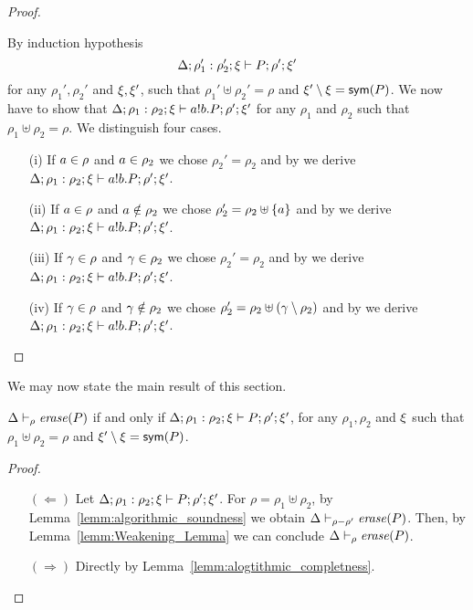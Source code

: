 \begin{proof}
\begin{itemize}
By induction hypothesis
\[
\Delta; \rho_1': \rho_2'; \xi \vdash P; \rho'; \xi'
\] 
for any $\rho_1', \rho_2'$ and $\xi, \xi'$, such that  $\rho_1'\uplus \rho_2'=\rho$ and $\xi'\setminus\xi=\mathsf{sym}(P)$. 
We now have to show that $\Delta; \rho_1:\rho_2 ; \xi \vdash a!b.P ; \rho'; \xi'$ for any $\rho_1$ and $\rho_2$ such that $\rho_1\uplus \rho_2 = \rho$. We distinguish four cases.
\begin{itemize}
\item[(i)] If $a\in\rho$ and $a\in\rho_2$ we chose $\rho_2'=\rho_2$ and by  we derive $\Delta; \rho_1: \rho_2; \xi \vdash a!b.P; \rho'; \xi'$.
%
\item[(ii)] If $a\in\rho$ and $a\notin\rho_2$ we chose $\rho_2'=\rho_2\uplus\{a\}$ and by  we derive $\Delta; \rho_1: \rho_2; \xi \vdash a!b.P; \rho'; \xi'$.
%
\item[(iii)] If $\gamma\in\rho$ and $\gamma\in\rho_2$ we chose $\rho_2'=\rho_2$ and by  we derive $\Delta; \rho_1: \rho_2; \xi \vdash a!b.P; \rho'; \xi'$.
\item[(iv)] If $\gamma\in\rho$ and $\gamma\notin\rho_2$ we chose $\rho_2'=\rho_2\uplus(\gamma\setminus\rho_2)$ and by  we derive $\Delta; \rho_1: \rho_2; \xi \vdash a!b.P; \rho'; \xi'$.
\end{itemize}
\end{itemize} 
\end{proof}

We may now state the main result of this section.


\begin{theorem}\label{lemm:algotirhmic_correctness}%
$\Delta \vdash_\rho \mathit{erase}(P)$ if and only if $\Delta; \rho_1: \rho_2; \xi \vdash P ; \rho'; \xi'$, for any $\rho_1,\rho_2$  and $\xi$ such that $\rho_1\uplus\rho_2=\rho$ and $\xi'\setminus\xi=\mathsf{sym}(P)$.
\end{theorem}
\begin{proof}
\begin{itemize}
\item[]
\item [$(\Leftarrow)$] Let $\Delta; \rho_1: \rho_2; \xi \vdash P ; \rho'; \xi'$. For $\rho=\rho_1\uplus\rho_2$,
by Lemma~\ref{lemm:algorithmic_soundness} we obtain $\Delta \vdash_{\rho-\rho'} \mathit{erase}(P)$. 
Then, by Lemma~\ref{lemm:Weakening_Lemma} we can conclude $\Delta \vdash_\rho \mathit{erase}(P)$.
%
\item [$(\Rightarrow)$] Directly by Lemma~\ref{lemm:alogtithmic_completness}.
\end{itemize}
\end{proof}

